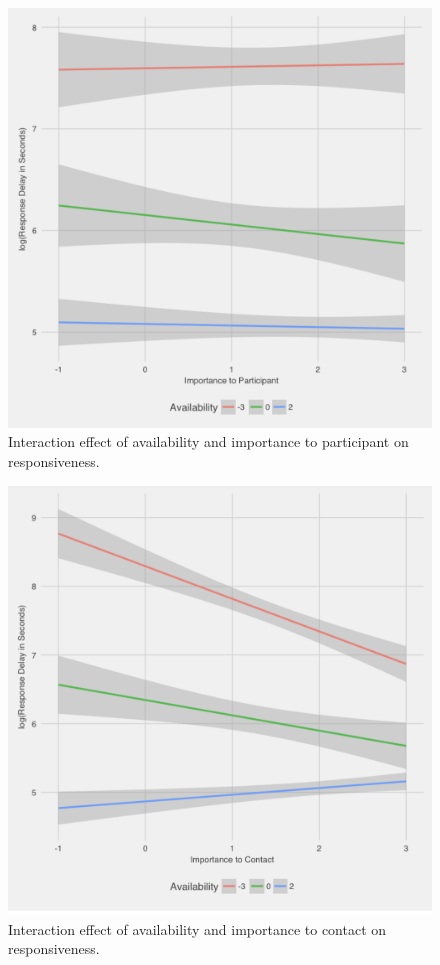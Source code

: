 \documentclass[12pt]{nuthesis}	%
\begin{document}
\begin{figure}[h]
\centering
\includegraphics[width=.7\textwidth]{figures/importance_availability_interaction}
\caption{Interaction effect of availability and importance to participant on responsiveness.}
\label{fig:importance_availability_interaction}
\end{figure}

\begin{figure}[h]
\centering
\includegraphics[width=.7\textwidth]{figures/importance_contact_availability_interaction}
\caption{Interaction effect of availability and importance to contact on responsiveness.}
\label{fig:importance_contact_availability_interaction}
\end{figure}
\end{document}
